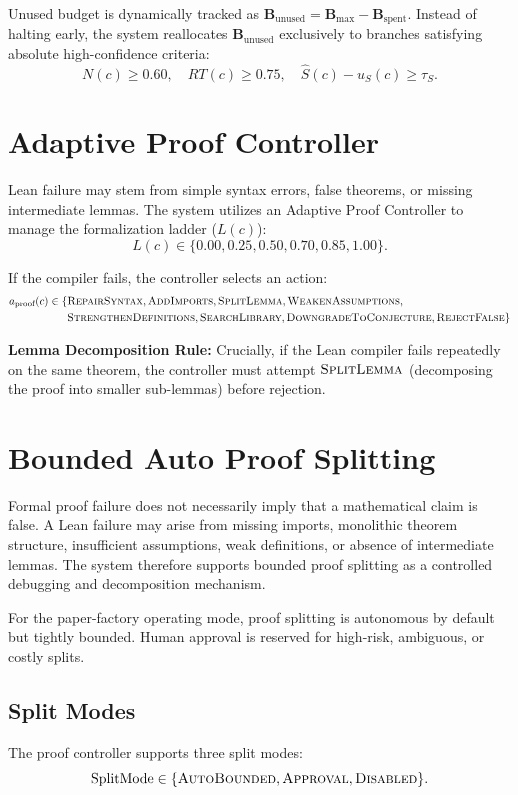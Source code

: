 \documentclass[11pt]{article}
\begin{document}
Unused budget is dynamically tracked as $\mathbf{B}_{\text{unused}} = \mathbf{B}_{\max} - \mathbf{B}_{\text{spent}}$. Instead of halting early, the system reallocates $\mathbf{B}_{\text{unused}}$ exclusively to branches satisfying absolute high-confidence criteria:
$$
N(c) \geq 0.60, \quad RT(c) \geq 0.75, \quad \hat{S}(c) - u_S(c) \geq \tau_S.
$$

\section{Adaptive Proof Controller}

Lean failure may stem from simple syntax errors, false theorems, or missing intermediate lemmas. The system utilizes an Adaptive Proof Controller to manage the formalization ladder ($L(c)$):
$$
L(c) \in \{0.00, 0.25, 0.50, 0.70, 0.85, 1.00\}.
$$

If the compiler fails, the controller selects an action:
$$
\begin{aligned}
a_{\text{proof}}(c) \in \{ & \textsc{RepairSyntax}, \textsc{AddImports}, \textsc{SplitLemma}, \textsc{WeakenAssumptions}, \\
& \textsc{StrengthenDefinitions}, \textsc{SearchLibrary}, \textsc{DowngradeToConjecture}, \textsc{RejectFalse} \}
\end{aligned}
$$

\textbf{Lemma Decomposition Rule:} Crucially, if the Lean compiler fails repeatedly on the same theorem, the controller must attempt $\textsc{SplitLemma}$ (decomposing the proof into smaller sub-lemmas) before rejection.

\section{Bounded Auto Proof Splitting}

Formal proof failure does not necessarily imply that a mathematical claim is false. A Lean failure may arise from missing imports, monolithic theorem structure, insufficient assumptions, weak definitions, or absence of intermediate lemmas. The system therefore supports bounded proof splitting as a controlled debugging and decomposition mechanism.

For the paper-factory operating mode, proof splitting is autonomous by default but tightly bounded. Human approval is reserved for high-risk, ambiguous, or costly splits.

\subsection{Split Modes}
The proof controller supports three split modes:
$$
\operatorname{SplitMode} \in \{ \textsc{AutoBounded}, \textsc{Approval}, \textsc{Disabled} \}.
$$
\end{document}
